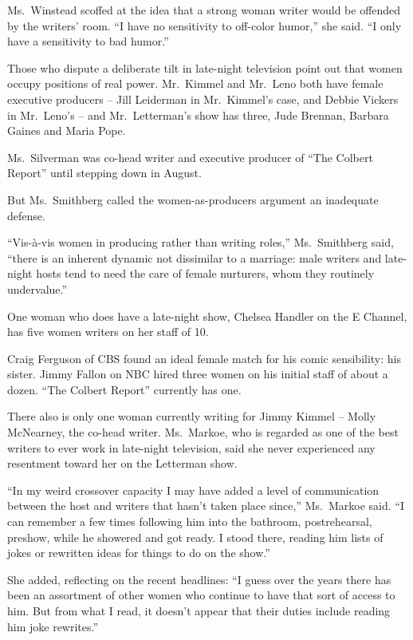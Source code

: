 ﻿\documentclass[12pt]{article}
\begin{document}
Ms.~Winstead scoffed at the idea that a strong woman writer would be offended by the writers' room.
``I have no sensitivity to off-color humor,'' she said. ``I only have a sensitivity to bad humor.''

Those who dispute a deliberate tilt in late-night television point out that women occupy positions
of real power. Mr.~Kimmel and Mr.~Leno both have female executive producers -- Jill Leiderman in
Mr.~Kimmel's case, and Debbie Vickers in Mr.~Leno's -- and Mr.~Letterman's show has three, Jude
Brennan, Barbara Gaines and Maria Pope.

Ms.~Silverman was co-head writer and executive producer of ``The Colbert Report'' until stepping
down in August.

But Ms.~Smithberg called the women-as-producers argument an inadequate defense.

``Vis-à-vis women in producing rather than writing roles,'' Ms.~Smithberg said, ``there is an
inherent dynamic not dissimilar to a marriage: male writers and late-night hosts tend to need the
care of female nurturers, whom they routinely undervalue.''

One woman who does have a late-night show, Chelsea Handler on the E Channel, has five women writers
on her staff of 10.

Craig Ferguson of CBS found an ideal female match for his comic sensibility: his sister. Jimmy
Fallon on NBC hired three women on his initial staff of about a dozen. ``The Colbert Report''
currently has one.

There also is only one woman currently writing for Jimmy Kimmel -- Molly McNearney, the co-head
writer. Ms.~Markoe, who is regarded as one of the best writers to ever work in late-night
television, said she never experienced any resentment toward her on the Letterman show.

``In my weird crossover capacity I may have added a level of communication between the host and
writers that hasn't taken place since,'' Ms.~Markoe said. ``I can remember a few times following him
into the bathroom, postrehearsal, preshow, while he showered and got ready. I stood there, reading
him lists of jokes or rewritten ideas for things to do on the show.''

She added, reflecting on the recent headlines: ``I guess over the years there has been an assortment
of other women who continue to have that sort of access to him. But from what I read, it doesn't
appear that their duties include reading him joke rewrites.''
\end{document}
